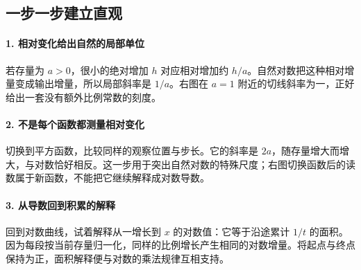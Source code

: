 \subsection*{一步一步建立直观}

\paragraph{1. 相对变化给出自然的局部单位}

若存量为 $a>0$，很小的绝对增加 $h$ 对应相对增加约 $h/a$。自然对数把这种相对增量变成输出增量，所以局部斜率是 $1/a$。右图在 $a=1$ 附近的切线斜率为一，正好给出一套没有额外比例常数的刻度。



\paragraph{2. 不是每个函数都测量相对变化}

切换到平方函数，比较同样的观察位置与步长。它的斜率是 $2a$，随存量增大而增大，与对数恰好相反。这一步用于突出自然对数的特殊尺度；右图切换函数后的读数属于新函数，不能把它继续解释成对数导数。



\paragraph{3. 从导数回到积累的解释}

回到对数曲线，试着解释从一增长到 $x$ 的对数值：它等于沿途累计 $1/t$ 的面积。因为每段按当前存量归一化，同样的比例增长产生相同的对数增量。将起点与终点保持为正，面积解释便与对数的乘法规律互相支持。
